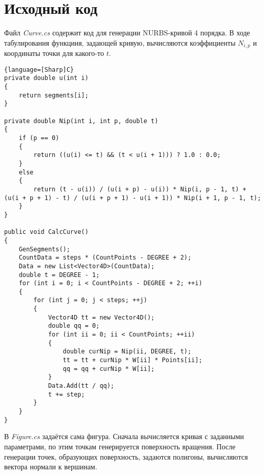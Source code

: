 \section{Исходный код}

Файл \textit{Curve.cs} содержит код для генерации NURBS-кривой 4 порядка. В ходе табулирования функциия, задающей кривую, вычисляются коэффициенты $N_{i,p}$ и координаты точки для какого-то $t$.

\begin{lstlisting}{language=[Sharp]C}
private double u(int i)
{
    return segments[i];
}

private double Nip(int i, int p, double t)
{
    if (p == 0)
    {
        return ((u(i) <= t) && (t < u(i + 1))) ? 1.0 : 0.0;
    }
    else
    {
        return (t - u(i)) / (u(i + p) - u(i)) * Nip(i, p - 1, t) + (u(i + p + 1) - t) / (u(i + p + 1) - u(i + 1)) * Nip(i + 1, p - 1, t);
    }
}

public void CalcCurve()
{
    GenSegments();
    CountData = steps * (CountPoints - DEGREE + 2);
    Data = new List<Vector4D>(CountData);
    double t = DEGREE - 1;
    for (int i = 0; i < CountPoints - DEGREE + 2; ++i)
    {
        for (int j = 0; j < steps; ++j)
        {
            Vector4D tt = new Vector4D();
            double qq = 0;
            for (int ii = 0; ii < CountPoints; ++ii)
            {
                double curNip = Nip(ii, DEGREE, t);
                tt = tt + curNip * W[ii] * Points[ii];
                qq = qq + curNip * W[ii];
            }
            Data.Add(tt / qq);
            t += step;
        }
    }
}
\end{lstlisting}
\pagebreak

В \textit{Figure.cs} задаётся сама фигура. Сначала вычисляется кривая с заданными параметрами, по этим точкам генерируется поверхность вращения. После генерации точек, образующих поверхность, задаются полигоны, вычисляются вектора нормали к вершинам.

